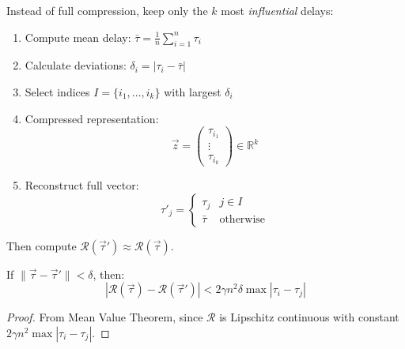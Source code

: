 \begin{solution}  
Instead of full compression, keep only the $k$ most \textit{influential} delays:  
\begin{enumerate}  
\item Compute mean delay: $\bar{\tau} = \frac{1}{n}\sum_{i=1}^n \tau_i$  
\item Calculate deviations: $\delta_i = |\tau_i - \bar{\tau}|$  
\item Select indices $I = \{i_1, \dots, i_k\}$ with largest $\delta_i$  
\item Compressed representation:  
\[  
\vec{z} = \begin{pmatrix} \tau_{i_1} \\ \vdots \\ \tau_{i_k} \end{pmatrix} \in \mathbb{R}^k  
\]  
\item Reconstruct full vector:  
\[  
\tau'_j = \begin{cases}  
\tau_j & j \in I \\  
\bar{\tau} & \text{otherwise}  
\end{cases}  
\]  
\end{enumerate}  
Then compute $\mathcal{R}(\vec{\tau}') \approx \mathcal{R}(\vec{\tau})$.  
\end{solution}  

\begin{theorem}  
\label{thm:error}  
If $\|\vec{\tau} - \vec{\tau}'\| < \delta$, then:  
\[  
|\mathcal{R}(\vec{\tau}) - \mathcal{R}(\vec{\tau}')| < 2\gamma n^2 \delta \max|\tau_i - \tau_j|  
\]  
\end{theorem}  
\begin{proof}  
From Mean Value Theorem, since $\mathcal{R}$ is Lipschitz continuous with constant $2\gamma n^2 \max|\tau_i - \tau_j|$.  
\end{proof}  

